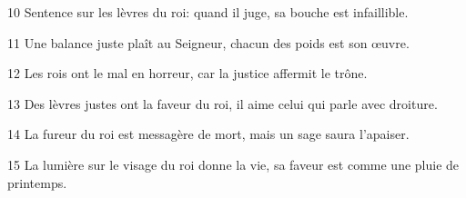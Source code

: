
10 Sentence sur les lèvres du roi: quand il juge, sa bouche est infaillible.

11 Une balance juste plaît au Seigneur, chacun des poids est son œuvre.

12 Les rois ont le mal en horreur, car la justice affermit le trône.

13 Des lèvres justes ont la faveur du roi, il aime celui qui parle avec droiture.

14 La fureur du roi est messagère de mort, mais un sage saura l’apaiser.

15 La lumière sur le visage du roi donne la vie, sa faveur est comme une pluie de printemps.